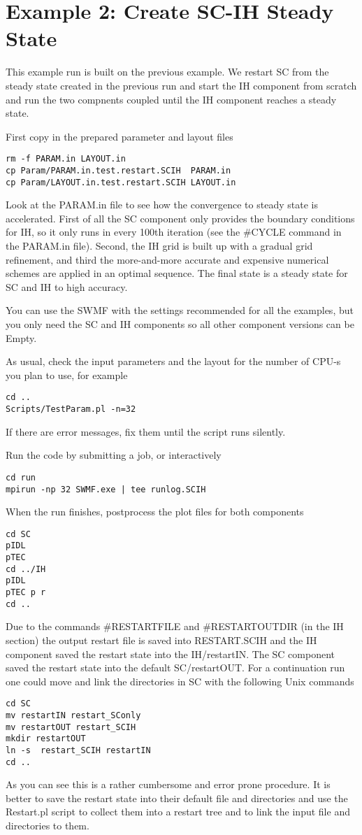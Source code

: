 \section{Example 2: Create SC-IH Steady State}

This example run is built on the previous example. We restart SC from the
steady state created in the previous run and start the IH component from 
scratch and run the two compnents coupled until the IH component reaches
a steady state. 

First copy in the prepared parameter and layout files
\begin{verbatim}
rm -f PARAM.in LAYOUT.in
cp Param/PARAM.in.test.restart.SCIH  PARAM.in
cp Param/LAYOUT.in.test.restart.SCIH LAYOUT.in
\end{verbatim}
Look at the PARAM.in file to see how the convergence to 
steady state is accelerated.
First of all the SC component only provides the boundary conditions for IH,
so it only runs in every 100th iteration (see the \#CYCLE command in
the PARAM.in file). Second, the IH grid is built
up with a gradual grid refinement, and third the 
more-and-more accurate and expensive numerical schemes are 
applied in an optimal sequence. The final state
is a steady state for SC and IH to high accuracy. 

You can use the SWMF with the settings recommended for all the examples,
but you only need the SC and IH components so 
all other component versions can be Empty.

As usual, check the input parameters and the layout for the
number of CPU-s you plan to use, for example
\begin{verbatim}
cd ..
Scripts/TestParam.pl -n=32
\end{verbatim}
If there are error messages, fix them until the script runs silently.

Run the code by submitting a job, or interactively
\begin{verbatim}
cd run
mpirun -np 32 SWMF.exe | tee runlog.SCIH
\end{verbatim}
When the run finishes, postprocess the plot files for both components
\begin{verbatim}
cd SC
pIDL
pTEC
cd ../IH
pIDL
pTEC p r
cd ..
\end{verbatim}
Due to the commands \#RESTARTFILE and \#RESTARTOUTDIR (in the IH section)
the output restart file is saved into RESTART.SCIH and the IH component
saved the restart state into the IH/restartIN. The SC component saved
the restart state into the default SC/restartOUT. For a continuation run
one could move and link the directories in SC with the following Unix commands
\begin{verbatim}
cd SC
mv restartIN restart_SConly
mv restartOUT restart_SCIH
mkdir restartOUT
ln -s  restart_SCIH restartIN
cd ..
\end{verbatim}
As you can see this is a rather cumbersome and error prone procedure.
It is better to save the restart state into their default file and
directories and use the Restart.pl script to collect them into 
a restart tree and to link the input file and directories to them.

